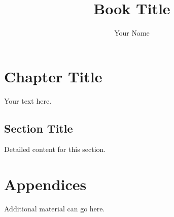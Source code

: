 \documentclass[a4paper,12pt]{book}
\title{Book Title}
\author{Your Name}
\date{}
\begin{document}
\maketitle

\frontmatter
\tableofcontents

\mainmatter

\chapter{Chapter Title}
Your text here.

\section{Section Title}
Detailed content for this section.

\backmatter
\chapter{Appendices}
Additional material can go here.
\end{document}
